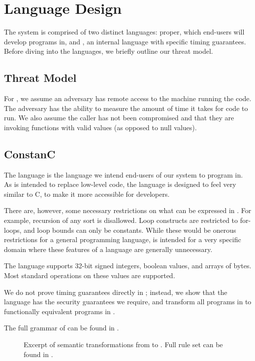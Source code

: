 \section{Language Design}
\label{sec:design}

The \constc system is comprised of two distinct languages: \constc proper, which end-users
will develop programs in, and \ccore, an internal language with specific timing guarantees. Before diving into the languages, we briefly outline our threat model.

\subsection{Threat Model}
For \constc, we assume an adversary has remote access to the machine running the code. The adversary has the ability to measure the amount of time it takes for \constc code to run. We also assume the caller has not been compromised and that they are invoking \constc functions with valid values (as opposed to null values).

\subsection{ConstanC}

The \constc language is the language we intend end-users of our system to program in.
As \constc is intended to replace low-level code, the language is designed to
feel very similar to C, to make it more accessible for developers.

There are, however, some necessary restrictions on what can be expressed in \constc.
For example, recursion of any sort is disallowed. Loop constructs are restricted to
for-loops, and loop bounds can only be constants. While these would be onerous restrictions for a general
programming language, \constc is intended for a very specific domain where these
features of a language are generally unnecessary.

The language supports 32-bit signed integers, boolean values, and arrays of bytes.
Most standard operations on these values are supported.

We do not prove timing guarantees directly in \constc; instead, we show
that the \ccore language has the security guarantees we require, and transform all programs
in \constc to functionally equivalent programs in \ccore.

The full grammar of \constc can be found in .

\begin{figure*}[t]
\begin{druleparx}[Stt]
\end{druleparx}
        \caption{Excerpt of semantic transformations from \constc to \ccore. Full rule set can be found in .}
    \label{fig:transform}
\end{figure*}

